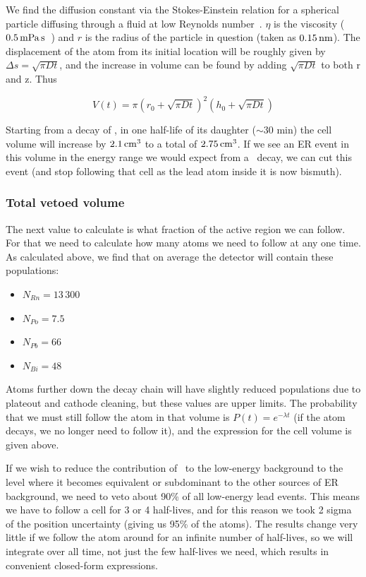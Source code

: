 We find the diffusion constant via the Stokes-Einstein relation for a spherical particle diffusing through a fluid at low Reynolds number~\cite{Sutherland:1905,Einstein:1905,Smoluchowski:1906}. $\eta$ is the viscosity ($0.5\,\mathrm{mPa\,s}$~\cite{Legros:1965}) and $r$ is the radius of the particle in question (taken as $0.15\,\mathrm{nm}$). The displacement of the atom from its initial location will be roughly given by $\Delta s = \sqrt{\pi Dt}$, and the increase in volume can be found by adding $\sqrt{\pi Dt}$ to both r and z. Thus

\begin{equation}
V(t) = \pi(r_0 + \sqrt{\pi Dt})^2(h_0 + \sqrt{\pi Dt})
\end{equation}

Starting from a decay of \Po, in one half-life of its daughter ($\sim$30 min) the cell volume will increase by $2.1\,\mathrm{cm^3}$ to a total of $2.75\,\mathrm{cm^3}$. If we see an ER event in this volume in the energy range we would expect from a \Pb~decay, we can cut this event (and stop following that cell as the lead atom inside it is now bismuth).

\subsubsection{Total vetoed volume}

The next value to calculate is what fraction of the active region we can follow. For that we need to calculate how many atoms we need to follow at any one time. As calculated above, we find that on average the detector will contain these populations:
\begin{itemize}
    \item $N_{Rn} = 13\,300$
    \item $N_{Po} = 7.5$
    \item $N_{Pb} = 66$
    \item $N_{Bi} = 48$
\end{itemize}

Atoms further down the decay chain will have slightly reduced populations due to plateout and cathode cleaning, but these values are upper limits. The probability that we must still follow the atom in that volume is $P(t) = e^{-\lambda t}$ (if the atom decays, we no longer need to follow it), and the expression for the cell volume is given above.

If we wish to reduce the contribution of \Pb~to the low-energy background to the level where it becomes equivalent or subdominant to the other sources of ER background, we need to veto about 90\% of all low-energy lead events. This means we have to follow a cell for 3 or 4 half-lives, and for this reason we took 2 sigma of the position uncertainty (giving us 95\% of the atoms). The results change very little if we follow the atom around for an infinite number of half-lives, so we will integrate over all time, not just the few half-lives we need, which results in convenient closed-form expressions.

